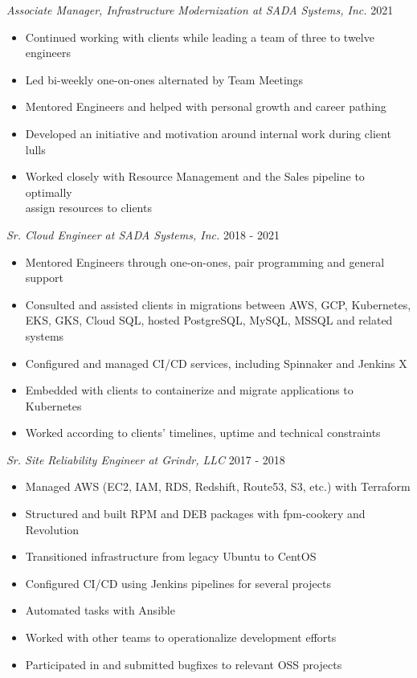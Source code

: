 \documentclass[line]{docs/resume/res}
\begin{document}
\begin{resume}
  {\sl Associate Manager, Infrastructure Modernization at SADA Systems, Inc.} \hfill 2021
  \begin{itemize} \itemsep -2pt
    \item Continued working with clients while leading a team of three to twelve engineers
    \item Led bi-weekly one-on-ones alternated by Team Meetings
    \item Mentored Engineers and helped with personal growth and career pathing
    \item Developed an initiative and motivation around internal work during client lulls
    \item Worked closely with Resource Management and the Sales pipeline to optimally \\
      assign resources to clients
  \end{itemize}

  {\sl Sr. Cloud Engineer at SADA Systems, Inc.} \hfill 2018 - 2021
  \begin{itemize} \itemsep -2pt
    \item Mentored Engineers through one-on-ones, pair programming and general support
    \item Consulted and assisted clients in migrations between AWS, GCP, Kubernetes, \\
      EKS, GKS, Cloud SQL, hosted PostgreSQL, MySQL, MSSQL and related systems
    \item Configured and managed CI/CD services, including Spinnaker and Jenkins X
    \item Embedded with clients to containerize and migrate applications to Kubernetes
    \item Worked according to clients' timelines, uptime and technical constraints
  \end{itemize}

  {\sl Sr. Site Reliability Engineer at Grindr, LLC} \hfill 2017 - 2018
  \begin{itemize} \itemsep -2pt %
    \item Managed AWS (EC2, IAM, RDS, Redshift, Route53, S3, etc.) with Terraform
    \item Structured and built RPM and DEB packages with fpm-cookery and Revolution
    \item Transitioned infrastructure from legacy Ubuntu to CentOS
    \item Configured CI/CD using Jenkins pipelines for several projects
    \item Automated tasks with Ansible
    \item Worked with other teams to operationalize development efforts
    \item Participated in and submitted bugfixes to relevant OSS projects
  \end{itemize}


\end{resume}
\end{document}
